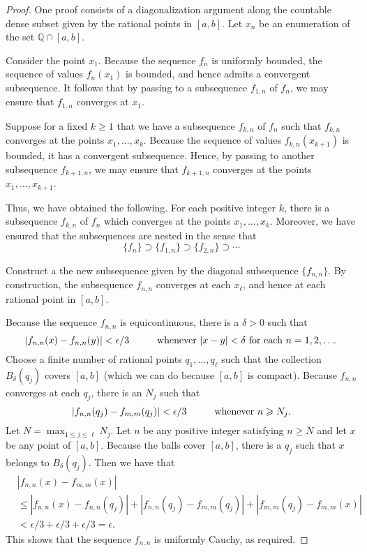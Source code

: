 \documentclass[12pt]{article}
\theoremstyle{definition}
\theoremstyle{theorem}
\begin{document}
\begin{proof}
One proof consists of a diagonalization argument along the countable dense subset given by the rational points in $[a,b]$.   Let $x_n$ be an enumeration of the set $\mathbb{Q} \cap [a,b]$. 

Consider the point $x_1$. Because the sequence $f_n$ is uniformly bounded, the sequence of values $f_n(x_1)$ is bounded, and hence admits a convergent subsequence. It follows that by passing to a subsequence $f_{1,n}$ of $f_n$, we may ensure that $f_{1,n}$ converges at $x_1$. 

Suppose for a fixed $k \geqslant 1$ that we have a subsequence $f_{k,n}$ of $f_n$ such that $f_{k,n}$ converges at the points $x_1, \ldots, x_k$. Because the sequence of values $f_{k,n}(x_{k+1})$ is bounded, it has a convergent subsequence. Hence, by passing to another subsequence $f_{k+1, n}$, we may ensure that $f_{k+1, n}$ converges at the points $x_1, \ldots, x_{k+1}$. 

Thus, we have obtained the following. For each positive integer $k$, there is a subsequence $f_{k,n}$ of $f_n$ which converges at the points $x_1, \ldots, x_k$. Moreover, we have ensured that the subsequences are nested in the sense that 
\[
\{f_n\} \supset \{f_{1,n}\} \supset \{f_{2,n}\} \supset \cdots
\]

Construct a the new subsequence given by the diagonal subsequence $\{f_{n,n}\}$. By construction, the subsequence $f_{n,n}$ converges at each $x_\ell$, and hence at each rational point in $[a,b]$. 

Because the sequence $f_{n,n}$ is equicontinuous, there is a $\delta > 0$ such that 
\[
|f_{n,n}(x) - f_{n,n}(y)| < \epsilon/3 \hspace{10mm} \text{whenever $|x - y| < \delta$ for each $n=1,2, \ldots$.}
\] 
Choose a finite number of rational points $q_1, \ldots, q_\ell$ such that the collection $B_\delta(q_j)$ covers $[a,b]$ (which we can do because $[a,b]$ is compact). Because $f_{n,n}$ converges at each $q_j$, there is an $N_j$ such that
\[
|f_{n,n}(q_j) - f_{m,m}(q_j)|<\epsilon/3 \hspace{10mm} \text{whenever $n \geqslant N_j$}.
\]
Let $N = \max_{1 \leqslant j \leqslant \ell} N_j$. Let $n$ be any positive integer satisfying $n \geqslant N$ and let $x$ be any point of $[a,b]$. Because the balls cover $[a,b]$, there is a $q_j$ such that $x$ belongs to $B_\delta(q_j)$. Then we have that   
\begin{align*}
&|f_{n,n}(x) - f_{m,m}(x)| \\
&\leqslant |f_{n,n}(x) - f_{n,n}(q_j)| + |f_{n,n}(q_j) - f_{m,m}(q_j)| + |f_{m,m}(q_j) - f_{m,m}(x)| \\
&< \epsilon/3 + \epsilon/3 + \epsilon/3 = \epsilon.
\end{align*}
This shows that the sequence $f_{n,n}$ is uniformly Cauchy, as required.  
\end{proof}
\end{document}
